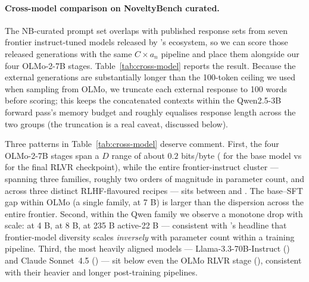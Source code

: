 \paragraph{Cross-model comparison on NoveltyBench curated.} The NB-curated prompt set overlaps with published response sets from seven frontier instruct-tuned models released by \citet{zhang2025noveltybench}'s ecosystem, so we can score those released generations with the same $C \times a_n$ pipeline and place them alongside our four OLMo-2-7B stages. Table~\ref{tab:cross-model} reports the result. Because the external generations are substantially longer than the 100-token ceiling we used when sampling from OLMo, we truncate each external response to 100 words before scoring; this keeps the concatenated contexts within the Qwen2.5-3B forward pass's memory budget and roughly equalises response length across the two groups (the truncation is a real caveat, discussed below).

\begin{table}[h]
\centering
\caption{Cross-model $D = C \times a_n$ (per-byte) on the \olmoNbCuratedN{} NoveltyBench curated prompts, $K=10$ responses per prompt. Our four OLMo-2-7B stages were sampled for this paper (temperature 1, $\texttt{max\_new\_tokens}{=}100$); the external frontier-model responses are the released 10-sample generations from \citet{zhang2025noveltybench}'s ecosystem (\texttt{alon-albalak/*-noveltybench-responses}), truncated to 100 words before scoring. All runs share the same Qwen2.5-3B scorer $\theta$ and 25 permutations.}
\label{tab:cross-model}
\small
{}
\end{table}

Three patterns in Table~\ref{tab:cross-model} deserve comment. First, the four OLMo-2-7B stages span a $D$ range of about $0.2$ bits/byte (\crossModelOlmoBase{} for the base model vs \crossModelOlmoInstruct{} for the final RLVR checkpoint), while the entire frontier-instruct cluster --- spanning three families, roughly two orders of magnitude in parameter count, and across three distinct RLHF-flavoured recipes --- sits between \crossModelLlamaThreeThreeSeventyB{} and \crossModelGptFive{}. The base--SFT gap within OLMo (a single family, at 7 B) is larger than the dispersion across the entire frontier. Second, within the Qwen family we observe a monotone drop with scale: \crossModelQwenFourB{} at 4 B, \crossModelQwenEightB{} at 8 B, \crossModelQwenTwoThreeFiveB{} at 235 B active-22 B --- consistent with \citet{zhang2025noveltybench}'s headline that frontier-model diversity scales \emph{inversely} with parameter count within a training pipeline. Third, the most heavily aligned models --- Llama-3.3-70B-Instruct (\crossModelLlamaThreeThreeSeventyB{}) and Claude Sonnet~4.5 (\crossModelClaudeSonnetFourFive{}) --- sit below even the OLMo RLVR stage (\crossModelOlmoInstruct{}), consistent with their heavier and longer post-training pipelines.

